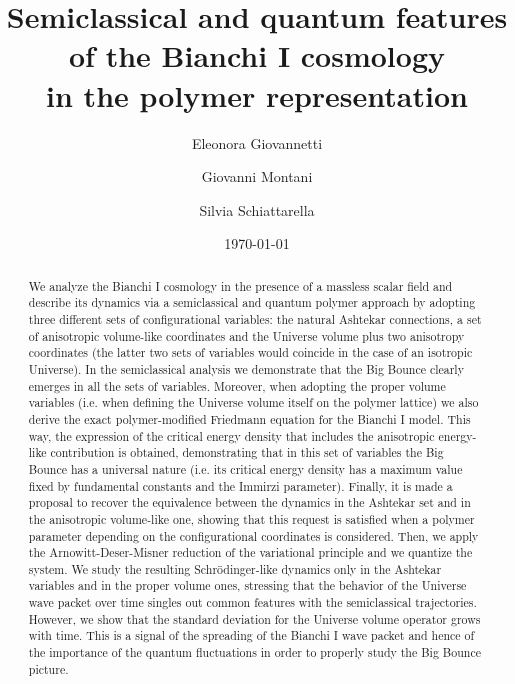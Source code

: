\documentclass[aps,prd,twocolumn,nofootinbib,superscriptaddress]{revtex4-2}
\begin{document}
\title{Semiclassical and quantum features of the Bianchi I cosmology \\in the polymer representation}
\author{Eleonora Giovannetti}
\author{Giovanni Montani}
\author{Silvia Schiattarella}
\date{\today}	

\begin{abstract}
We analyze the Bianchi I cosmology in the presence of a massless scalar
field and describe its dynamics via a semiclassical and quantum polymer
approach by adopting three different sets of configurational variables:
the natural Ashtekar connections, a set of anisotropic volume-like coordinates and the Universe volume plus two anisotropy
coordinates (the latter two sets of variables would coincide in the case of an
isotropic Universe). In the semiclassical analysis we demonstrate that the Big Bounce clearly emerges in all the sets of variables. Moreover, when adopting the proper volume variables (i.e. when defining the Universe volume itself on the polymer lattice) we also derive the exact polymer-modified Friedmann equation for the Bianchi I model. This way, the expression of the critical energy density that includes the anisotropic energy-like contribution is obtained, demonstrating that in this set of variables the Big Bounce has a universal nature (i.e. its critical energy density has a maximum value fixed by fundamental constants and the Immirzi parameter). Finally, it is made a proposal to recover the equivalence between the dynamics in the Ashtekar set and in the anisotropic volume-like one, showing that this request is satisfied when a polymer parameter depending on the configurational coordinates is considered. Then, we apply the Arnowitt-Deser-Misner reduction of the variational principle and we quantize the system. We study the resulting Schr\"{o}dinger-like dynamics only in the Ashtekar variables and in the proper volume ones, stressing that the behavior of the Universe wave packet over time singles out common features with the semiclassical trajectories. However, we show that the standard deviation for the Universe volume operator grows with time. This is a signal of the spreading of the Bianchi I wave packet and hence of the importance of the quantum fluctuations in order to properly study the Big Bounce picture.
\end{abstract}
\end{document}
